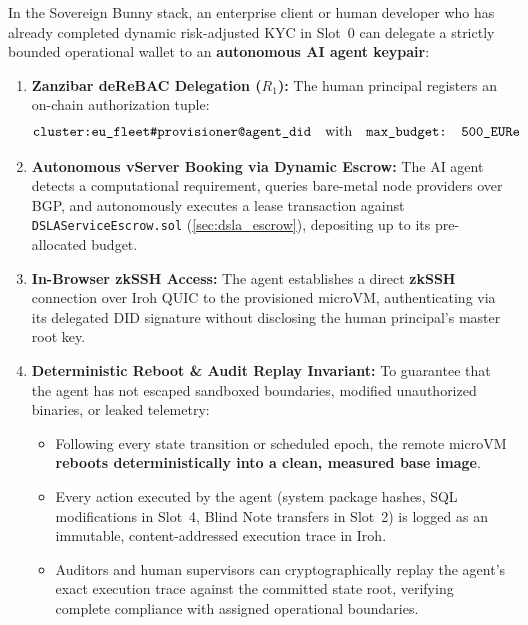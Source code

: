 \documentclass[a4paper,11pt,twoside,parskip=half-,headings=small]{scrartcl}
\newcommand{\code}[1]{\texttt{#1}}
\begin{document}
In the Sovereign Bunny stack, an enterprise client or human developer who has already completed dynamic risk-adjusted
KYC in Slot~0 can delegate a strictly bounded operational wallet to an \textbf{autonomous AI agent keypair}:
\begin{enumerate}
  \item \textbf{Zanzibar deReBAC Delegation ($R_1$):} The human principal registers an on-chain authorization tuple:
  \begin{equation}
    \text{\ttfamily cluster:eu\_fleet\#provisioner@agent\_did} \quad \text{with} \quad \text{\ttfamily max\_budget: 500\_EURe}
  \end{equation}
  \item \textbf{Autonomous vServer Booking via Dynamic Escrow:} The AI agent detects a computational requirement, queries bare-metal node providers over BGP, and autonomously executes a lease transaction against \code{DSLAServiceEscrow.sol} (\cref{sec:dsla_escrow}), depositing up to its pre-allocated budget.
  \item \textbf{In-Browser zkSSH Access:} The agent establishes a direct \textbf{zkSSH} connection over Iroh QUIC to the provisioned microVM, authenticating via its delegated DID signature without disclosing the human principal's master root key.
  \item \textbf{Deterministic Reboot \& Audit Replay Invariant:} To guarantee that the agent has not escaped sandboxed boundaries, modified unauthorized binaries, or leaked telemetry:
  \begin{itemize}
    \item Following every state transition or scheduled epoch, the remote microVM \textbf{reboots deterministically into a clean, measured base image}.
    \item Every action executed by the agent (system package hashes, SQL modifications in Slot~4, Blind Note transfers in Slot~2) is logged as an immutable, content-addressed execution trace in Iroh.
    \item Auditors and human supervisors can cryptographically replay the agent's exact execution trace against the committed state root, verifying complete compliance with assigned operational boundaries.
  \end{itemize}
\end{enumerate}
\end{document}
